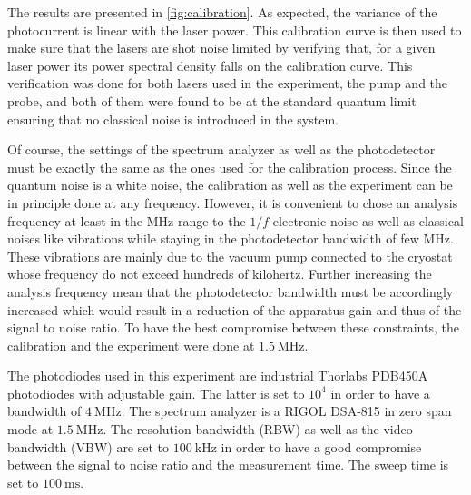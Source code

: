 \bigskip

The results are presented in \autoref{fig:calibration}.
As expected, the variance of the photocurrent is linear with the laser power. This calibration curve is then used to make sure that the lasers are shot noise limited by verifying that, for a given laser power 
its power spectral density falls on the calibration curve. This verification was done for both lasers used in the experiment, the pump and the probe, and both of them were found to be at the standard quantum limit ensuring that no classical noise is 
 introduced in the system.

Of course, the settings of the spectrum analyzer as well as the photodetector must be exactly the same as the ones used for the calibration process. Since the quantum noise 
is a white noise, the calibration as well as the experiment can be in principle done at any frequency. However, it is convenient to chose an analysis frequency at least in the MHz range to the $1/f$ electronic noise as well as classical noises like vibrations while staying in the photodetector bandwidth of few MHz. These vibrations are mainly due to the vacuum pump connected to the cryostat whose 
frequency do not exceed hundreds of kilohertz. Further increasing the analysis frequency mean that the photodetector bandwidth must be accordingly increased which would result in a reduction of the apparatus gain and thus of the signal to noise ratio.
To have the best compromise between these constraints, the calibration and the experiment were done at $\SI{1.5}{\mega\hertz}$. 


 


The photodiodes used in this experiment are industrial Thorlabs PDB450A photodiodes with adjustable gain. The latter is set to $10^4$ in order to have a bandwidth of $\SI{4}{\mega\hertz}$.
The spectrum analyzer is a RIGOL DSA-815 in zero span mode at $\SI{1.5}{\mega\hertz}$. The resolution bandwidth (RBW) as well as the video bandwidth (VBW) are set to $\SI{100}{\kilo\hertz}$ in order to have a good compromise between the signal to noise ratio and the measurement time.
The sweep time is set to $\SI{100}{\milli\second}$.


